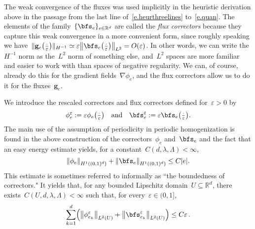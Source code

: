 \documentclass[11pt,twoside]{article} %
\numberwithin{equation}{section}
\theoremstyle{definition}
\let\originalleft\left
\let\originalright\right
\renewcommand{\left}{\mathopen{}\mathclose\bgroup\originalleft}
\renewcommand{\right}{\aftergroup\egroup\originalright}
\newcommand*{\R}{\ensuremath{\mathbb{R}}}
\newcommand*{\Rd}{\ensuremath{\mathbb{R}^d}}
\newcommand{\eps}{\varepsilon}
\newcommand{\qand}{\quad \mbox{and} \quad }
\newcommand{\g}{\mathbf{g}}
\newcommand{\ep}{\eps}
\begin{document}
\smallskip

The weak convergence of the fluxes was used implicitly in the heuristic derivation above in the passage from the last line of~\eqref{e.heurthreelines} to~\eqref{e.quan}. The elements of the family~$\{ \bfs_e \}_{e\in\R^d}$ are called the \emph{flux correctors} because they capture this weak convergence in a more convenient form, since roughly speaking we have~$\| \g_e\bigl(\tfrac \cdot \ep\bigr) \|_{H^{-1}} \simeq \ep \left\| \bfs_e\bigl(\tfrac \cdot \ep\bigr) \right\|_{L^2} = O(\ep)$. In other words, we can write the~$H^{-1}$ norm as the~$L^2$ norm of something else, and~$L^2$ spaces are more familiar and easier to work with than spaces of negative regularity. We can, of course, already do this for the gradient fields~$\nabla \phi_e$, and the flux correctors allow us to do it for the fluxes~$\g_e$. 

\smallskip

We introduce the rescaled correctors and flux correctors defined for~$\ep >0$ by
\begin{equation} \label{e.scaledcorrectors}
\phi^\ep_e  :=  \ep \phi_e \bigl(\tfrac \cdot\ep \bigr)
\qand
\bfs_e^\ep  := \ep  \bfs_e \bigl(\tfrac \cdot\ep \bigr).
\end{equation}
The main use of the assumption of periodicity in periodic homogenization is found in the above construction of the correctors~$\phi_e$ and~$\bfs_e$ and the fact that an easy energy estimate yields, for a constant~$C(d,\lambda,\Lambda)<\infty$, 
\begin{equation}
\label{e.correctorsbounded}
\left\| \phi_e \right\|_{H^1((0,1)^d)} 
+
\left\| \bfs_e \right\|_{H^1((0,1)^d)}
\leq 
C|e|.
\end{equation}
This estimate is sometimes referred to informally as ``the boundedness of correctors."
It yields that, for any bounded Lipschitz domain~$U\subseteq\Rd$, there exists~$C(U,d,\lambda,\Lambda)<\infty$ such that, for every~$\ep\in (0,1]$, 
\begin{equation}
\label{e.correctorsbounded2}
\sum_{k=1}^d 
\Bigl( \bigl\| \phi_{e_k}^\ep  \bigr\|_{L^2(U)}  + \bigl\| \bfs_{e_k}^\ep  \bigr\|_{L^2(U)} \Bigr)
\leq 
C \ep
\,.
\end{equation}
\end{document}
